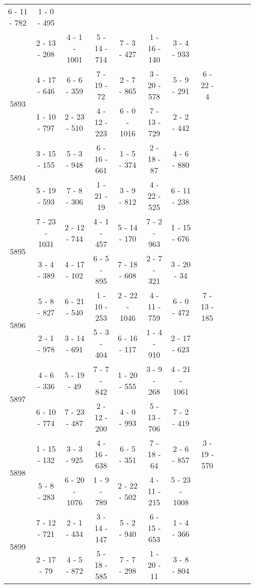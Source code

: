\begin{longtable}{c | c | c | c | c | c | c | c | c | c | c | c}
6 - 11 - 782
&
1 - 0 - 495
&\space\\* \space
&
2 - 13 - 208
&
4 - 1 - 1001
&
5 - 14 - 714
&
7 - 3 - 427
&
1 - 16 - 140
&
3 - 4 - 933
&\space\\\hline
\multirow{2}{*}{5893}
& 4 - 17 - 646
&
6 - 6 - 359
&
7 - 19 - 72
&
2 - 7 - 865
&
3 - 20 - 578
&
5 - 9 - 291
&
6 - 22 - 4
\\* \space
&
1 - 10 - 797
&
2 - 23 - 510
&
4 - 12 - 223
&
6 - 0 - 1016
&
7 - 13 - 729
&
2 - 2 - 442
&\space\\\hline
\multirow{2}{*}{5894}
& 3 - 15 - 155
&
5 - 3 - 948
&
6 - 16 - 661
&
1 - 5 - 374
&
2 - 18 - 87
&
4 - 6 - 880
&\space\\* \space
&
5 - 19 - 593
&
7 - 8 - 306
&
1 - 21 - 19
&
3 - 9 - 812
&
4 - 22 - 525
&
6 - 11 - 238
&\space\\\hline
\multirow{2}{*}{5895}
& 7 - 23 - 1031
&
2 - 12 - 744
&
4 - 1 - 457
&
5 - 14 - 170
&
7 - 2 - 963
&
1 - 15 - 676
&\space\\* \space
&
3 - 4 - 389
&
4 - 17 - 102
&

6 - 5 - 895
&
7 - 18 - 608
&
2 - 7 - 321
&
3 - 20 - 34
&\space\\\hline
\multirow{2}{*}{5896}
& 5 - 8 - 827
&
6 - 21 - 540
&
1 - 10 - 253
&
2 - 22 - 1046
&
4 - 11 - 759
&
6 - 0 - 472
&
7 - 13 - 185
\\* \space
&
2 - 1 - 978
&
3 - 14 - 691
&
5 - 3 - 404
&
6 - 16 - 117
&
1 - 4 - 910
&
2 - 17 - 623
&\space\\\hline
\multirow{2}{*}{5897}
& 4 - 6 - 336
&
5 - 19 - 49
&
7 - 7 - 842
&
1 - 20 - 555
&
3 - 9 - 268
&
4 - 21 - 1061
&\space\\* \space
&
6 - 10 - 774
&
7 - 23 - 487
&
2 - 12 - 200
&
4 - 0 - 993
&
5 - 13 - 706
&
7 - 2 - 419
&\space\\\hline
\multirow{2}{*}{5898}
& 1 - 15 - 132
&
3 - 3 - 925
&
4 - 16 - 638
&
6 - 5 - 351
&
7 - 18 - 64
&
2 - 6 - 857
&
3 - 19 - 570
\\* \space
&
5 - 8 - 283
&
6 - 20 - 1076
&
1 - 9 - 789
&
2 - 22 - 502
&
4 - 11 - 215
&
5 - 23 - 1008
&\space\\\hline
\multirow{2}{*}{5899}
& 7 - 12 - 721
&
2 - 1 - 434
&
3 - 14 - 147
&
5 - 2 - 940
&
6 - 15 - 653
&
1 - 4 - 366
&\space\\* \space
&
2 - 17 - 79
&
4 - 5 - 872
&
5 - 18 - 585
&
7 - 7 - 298
&
1 - 20 - 11
&
3 - 8 - 804
&\space\\\hline
\end{longtable}

